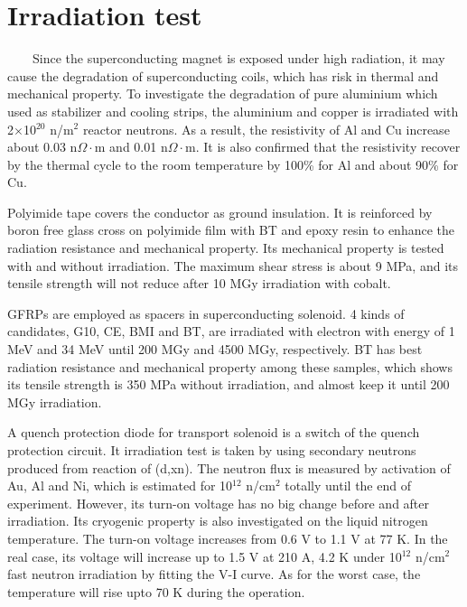 \documentclass[a4paper, 10pt, twocolumn]{article}
\begin{document}
\section{Irradiation test}
~~~~Since the superconducting magnet is exposed under high radiation, it may cause the degradation of superconducting coils, which has risk in thermal and mechanical property.
To investigate the degradation of pure aluminium which used as stabilizer and cooling strips, the aluminium and copper is irradiated with 2$\times$10$^{20}$ n/m$^2$ reactor neutrons.
As a result, the resistivity of Al and Cu increase about 0.03 n$\Omega\cdot$m and 0.01 n$\Omega\cdot$m.
It is also confirmed that the resistivity recover by the thermal cycle to the room temperature by 100\% for Al and about 90\% for Cu.

Polyimide tape covers the conductor as ground insulation.
It is reinforced by boron free glass cross on polyimide film with BT and epoxy resin to enhance the radiation resistance and mechanical property.
Its mechanical property is tested with and without irradiation.
The maximum shear stress is about 9 MPa, and its tensile strength will not reduce after 10 MGy irradiation with cobalt.

GFRPs are employed as spacers in superconducting solenoid.
4 kinds of candidates, G10, CE, BMI and BT, are irradiated with electron with energy of 1 MeV and 34 MeV until 200 MGy and 4500 MGy, respectively.
BT has best radiation resistance and mechanical property among these samples, which shows its tensile strength is 350 MPa without irradiation, and almost keep it until 200 MGy irradiation.

A quench protection diode for transport solenoid is a switch of the quench protection circuit.
It irradiation test is taken by using secondary neutrons produced from reaction of (d,xn).
The neutron flux is measured by activation of Au, Al and Ni, which is estimated for 10$^{12}$ n/cm$^2$ totally until the end of experiment.
However, its turn-on voltage has no big change before and after irradiation.
Its cryogenic property is also investigated on the liquid nitrogen temperature.
The turn-on voltage increases from 0.6 V to 1.1 V at 77 K.
In the real case, its voltage will increase up to 1.5 V at 210 A, 4.2 K under 10$^{12}$ n/cm$^2$ fast neutron irradiation by fitting the V-I curve.
As for the worst case, the temperature will rise upto 70 K during the operation.
\end{document}
